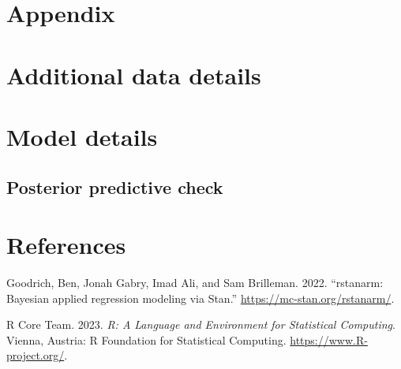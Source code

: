 \documentclass[
  letterpaper,
  DIV=11,
  numbers=noendperiod]{scrartcl}
\newlength{\cslhangindent}
\newenvironment{CSLReferences}[2] %
 {\begin{list}{}{%
  \setlength{\itemindent}{0pt}
  \setlength{\leftmargin}{0pt}
  \setlength{\parsep}{0pt}
  \ifodd #1
   \setlength{\leftmargin}{\cslhangindent}
   \setlength{\itemindent}{-1\cslhangindent}
  \fi
  \setlength{\itemsep}{#2\baselineskip}}}
 {\end{list}}
\begin{document}
\newpage

\appendix

\section*{Appendix}\label{appendix}

\section{Additional data details}\label{additional-data-details}

\section{Model details}\label{sec-model-details}

\subsection{Posterior predictive
check}\label{posterior-predictive-check}

\newpage

\section*{References}\label{references}

\label{refs}
\begin{CSLReferences}{1}{0}
Goodrich, Ben, Jonah Gabry, Imad Ali, and Sam Brilleman. 2022.
{``{rstanarm: {Bayesian} applied regression modeling via {Stan}}.''}
\url{https://mc-stan.org/rstanarm/}.

R Core Team. 2023. \emph{{R: A Language and Environment for Statistical
Computing}}. Vienna, Austria: R Foundation for Statistical Computing.
\url{https://www.R-project.org/}.

\end{CSLReferences}
\end{document}

